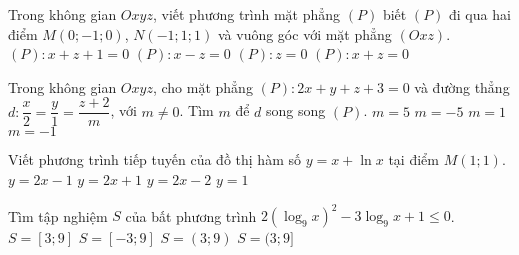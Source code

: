 \begin{ex}%
	Trong không gian $ Oxyz $, viết phương trình mặt phẳng $ (P) $ biết $ (P) $ đi qua hai điểm $ M(0;-1;0) $, $ N(-1;1;1) $ và vuông góc với mặt phẳng $ (Oxz) $.
	\choice
	{$ (P) \colon x+z+1=0 $}
	{$ (P) \colon x-z=0 $}
	{$ (P) \colon z=0 $}
	{\True $ (P) \colon x+z=0 $}
\end{ex}

\begin{ex}%
	Trong không gian $Oxyz$, cho mặt phẳng $(P) \colon 2x+y+z+3=0$ và đường thẳng $d: \dfrac{x}{2}=\dfrac{y}{1}=\dfrac{z+2}{m}$, với $m\neq 0$. Tìm $m$ để $d$ song song $(P)$.
	\choice
	{$m=5 $}
	{\True $m=-5 $}
	{$m=1 $}
	{$m=-1 $}
\end{ex}

\begin{ex}%
	Viết phương trình tiếp tuyến của đồ thị hàm số $y=x+\ln x$ tại điểm $M(1;1)$.
	\choice
	{\True $y=2x-1 $}
	{$y=2x+1 $}
	{$y=2x-2 $}
	{$y=1 $}
\end{ex}

\begin{ex}%
	Tìm tập nghiệm $S$ của bất phương trình $2(\log_9x)^2-3\log_9x+1\leq 0$.
	\choice
	{\True $S=[3;9] $}
	{$S=[-3;9] $}
	{$S=(3;9) $}
	{$S=(3;9] $}
\end{ex}

